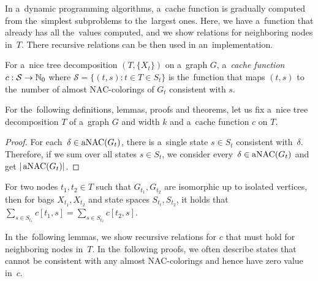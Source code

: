 In a~dynamic programming algorithms, a~cache function is gradually computed
from the~simplest subproblems to the~largest ones.
Here, we have a~function that already has all the~values computed,
and we show relations for neighboring nodes in~\( T \).
There recursive relations can be then used in an~implementation.
%
\begin{definition}
	For a~nice tree decomposition \( (T, \{X_t\}) \) on a~graph \( G \),
	a~\emph{cache function} \( c: \mathcal{S} \to \mathbb{N}_0 \)
	where \( \mathcal{S} = \{ (t,s): t \in T \in S_t \} \)
	is the~function that maps \( (t, s) \)
	to the~number of almost NAC-colorings of \( G_t \) consistent with \( s \).
\end{definition}
%
For the~following definitions, lemmas, proofs and theorems, let us fix
a~nice tree decomposition \( T \) of a~graph \( G \) and width \( k \)
and a~cache function \( c \) on \( T \).
%
%
\begin{proof}
	For each~\( \delta \in \operatorname{aNAC}(G_t) \),
	there is a~single state \( s \in S_t \) consistent with~\( \delta \).
	Therefore, if we sum over all states \( s \in S_t \),
	we consider every~\( \delta \in \operatorname{aNAC}(G_t) \) and get \( |\operatorname{aNAC}(G_t)| \).
\end{proof}
%
\begin{observation}
	For two nodes \( t_1, t_2 \in T \) such that \( G_{t_1}, G_{t_2} \)
	are isomorphic up to isolated vertices,
	then for bags \( X_{t_1}, X_{t_2} \) and state spaces \( S_{t_t}, S_{t_2} \),
	it holds that \( \sum_{s \in S_{t_1}} c[t_1, s] = \sum_{s \in S_{t_2}} c[t_2, s] \).
\end{observation}
%
%

In the~following lemmas, we show recursive relations for \( c \) that must hold
for neighboring nodes in~\( T \).
%
In the~following proofs,
we often describe states that cannot be consistent with
any almost NAC-colorings and hence have zero value in~\( c \).

